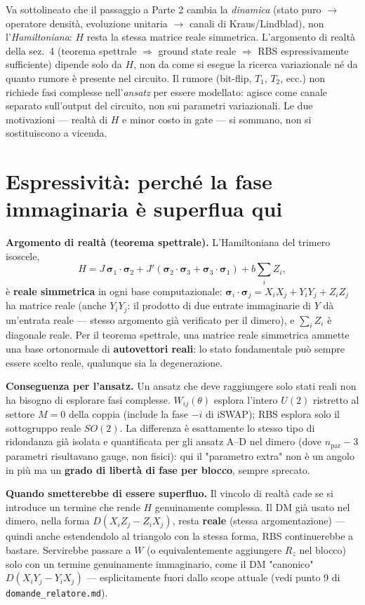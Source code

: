 \documentclass[11pt,a4paper]{article}
\begin{document}
Va sottolineato che il passaggio a Parte 2 cambia la \emph{dinamica}
(stato puro $\to$ operatore densità, evoluzione unitaria $\to$ canali
di Kraus/Lindblad), non l'\emph{Hamiltoniana}: $H$ resta la stessa
matrice reale simmetrica. L'argomento di realtà della sez.~4 (teorema
spettrale $\Rightarrow$ ground state reale $\Rightarrow$ RBS
espressivamente sufficiente) dipende solo da $H$, non da come si
esegue la ricerca variazionale né da quanto rumore è presente nel
circuito. Il rumore (bit-flip, $T_1$, $T_2$, ecc.) non richiede fasi
complesse nell'\emph{ansatz} per essere modellato: agisce come canale
separato sull'output del circuito, non sui parametri variazionali. Le
due motivazioni --- realtà di $H$ e minor costo in gate --- si
sommano, non si sostituiscono a vicenda.

\section{Espressività: perché la fase immaginaria è superflua qui}

\textbf{Argomento di realtà (teorema spettrale).} L'Hamiltoniana del
trimero isoscele,
$$H=J\,\boldsymbol\sigma_1\cdot\boldsymbol\sigma_2+J'(\boldsymbol\sigma_2\cdot\boldsymbol\sigma_3+\boldsymbol\sigma_3\cdot\boldsymbol\sigma_1)+b\sum_iZ_i,$$
è \textbf{reale simmetrica} in ogni base computazionale:
$\boldsymbol\sigma_i\cdot\boldsymbol\sigma_j=X_iX_j+Y_iY_j+Z_iZ_j$ ha
matrice reale (anche $Y_iY_j$: il prodotto di due entrate immaginarie
di $Y$ dà un'entrata reale --- stesso argomento già verificato per il
dimero), e $\sum_iZ_i$ è diagonale reale. Per il teorema spettrale, una
matrice reale simmetrica ammette una base ortonormale di
\textbf{autovettori reali}: lo stato fondamentale può sempre essere
scelto reale, qualunque sia la degenerazione.

\textbf{Conseguenza per l'ansatz.} Un ansatz che deve raggiungere solo
stati reali non ha bisogno di esplorare fasi complesse. $W_{ij}(\theta)$
esplora l'intero $U(2)$ ristretto al settore $M=0$ della coppia
(include la fase $-i$ di iSWAP); RBS esplora solo il sottogruppo reale
$SO(2)$. La differenza è esattamente lo stesso tipo di ridondanza già
isolata e quantificata per gli ansatz A--D nel dimero (dove
$n_\text{par}-3$ parametri risultavano gauge, non fisici): qui il
"parametro extra" non è un angolo in più ma un \textbf{grado di libertà
di fase per blocco}, sempre sprecato.

\textbf{Quando smetterebbe di essere superfluo.} Il vincolo di realtà
cade se si introduce un termine che rende $H$ genuinamente complessa.
Il DM già usato nel dimero, nella forma $D(X_iZ_j-Z_iX_j)$, resta
\textbf{reale} (stessa argomentazione) --- quindi anche estendendolo al
triangolo con la stessa forma, RBS continuerebbe a bastare. Servirebbe
passare a $W$ (o equivalentemente aggiungere $R_z$ nel blocco) solo con
un termine genuinamente immaginario, come il DM "canonico"
$D(X_iY_j-Y_iX_j)$ --- esplicitamente fuori dallo scope attuale (vedi
punto 9 di \texttt{domande\_relatore.md}).
\end{document}

